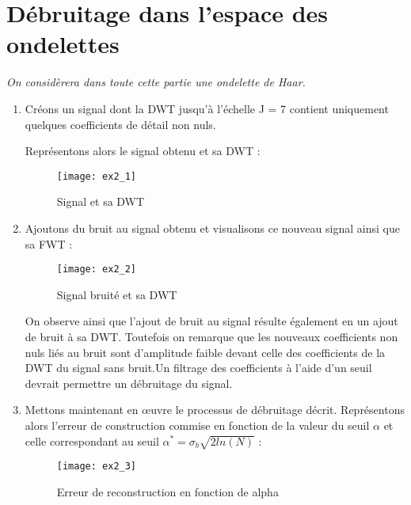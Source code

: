 \documentclass[12pt,a4paper,titlepage]{article}
\begin{document}
\section{Débruitage dans l'espace des ondelettes}

\emph{On considèrera dans toute cette partie une ondelette de Haar.}

\begin{enumerate}
    \item{Créons un signal dont la DWT jusqu'à l'échelle  J = 7 contient
            uniquement quelques coefficients de détail non nuls.

            Représentons alors le signal obtenu et sa DWT :

            \begin{figure}[H]
                \caption{Signal et sa DWT}
                \texttt{[image: ex2\_1]}
                \centering
            \end{figure}
        }

    \item{Ajoutons du bruit au signal obtenu et visualisons ce nouveau
            signal ainsi que sa FWT :

            \begin{figure}[H]
                \caption{Signal bruité et sa DWT}
                \texttt{[image: ex2\_2]}
                \centering
            \end{figure}

            On observe ainsi que l'ajout de bruit au signal résulte
            également en un ajout de bruit à sa DWT. Toutefois on
            remarque que les nouveaux coefficients non nuls liés au
            bruit sont d'amplitude faible devant celle des coefficients
            de la DWT du signal sans bruit.Un filtrage des coefficients
            à l'aide d'un seuil devrait permettre un débruitage du signal.
        }

    \item{Mettons maintenant en œuvre le processus de débruitage décrit.
            Représentons alors l'erreur de construction commise en fonction
            de la valeur du seuil $\alpha$ et celle correspondant au seuil
            $\alpha^* = \sigma_b \sqrt{2 ln(N)}$ :

            \begin{figure}[H]
                \caption{Erreur de reconstruction en fonction de alpha}
                \texttt{[image: ex2\_3]}
                \centering
            \end{figure}
        }


\end{enumerate}
\end{document}
